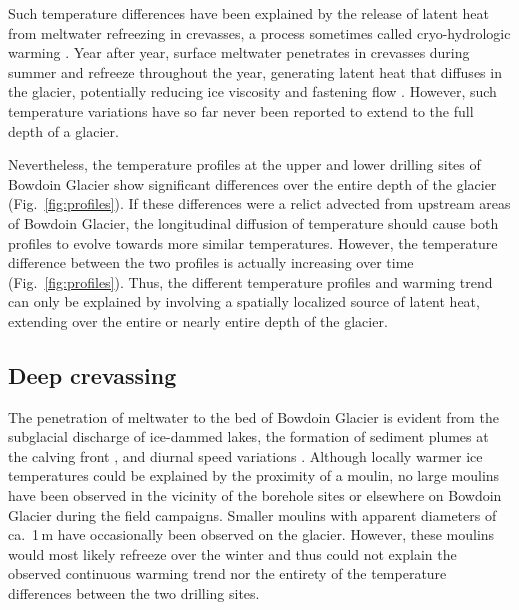\documentclass[utf8]{article}
\begin{document}
    Such temperature differences have been explained by the release of latent
    heat from meltwater refreezing in crevasses, a process sometimes called
    cryo-hydrologic warming \citep{Phillips.etal.2010}. Year after year,
    surface meltwater penetrates in crevasses during summer and refreeze
    throughout the year, generating latent heat that diffuses in the
    glacier, potentially reducing ice viscosity and fastening flow
    \citep{Phillips.etal.2013}. However, such temperature variations have so
    far never been reported to extend to the full depth of a glacier.

    Nevertheless, the temperature profiles at the upper and lower drilling
    sites of Bowdoin Glacier show significant differences over the entire depth
    of the glacier (Fig.~\ref{fig:profiles}). If these differences were a
    relict advected from upstream areas of Bowdoin Glacier, the longitudinal
    diffusion of temperature should cause both profiles to evolve towards more
    similar temperatures. However, the temperature difference between the two
    profiles is actually increasing over time (Fig.~\ref{fig:profiles}).
    Thus, the different temperature profiles and warming trend can only be
    explained by involving a spatially localized source of latent heat,
    extending over the entire or nearly entire depth of the glacier.


\subsection{Deep crevassing}

    The penetration of meltwater to the bed of Bowdoin Glacier is evident from
    the subglacial discharge of ice-dammed lakes, the formation of sediment
    plumes at the calving front \citep{Jouvet.etal.2018, Kanna.etal.2018}, and
    diurnal speed variations \citep{Sugiyama.etal.2014, Podolskiy.etal.2016}.
    Although locally warmer ice temperatures could be explained by the
    proximity of a moulin, no large moulins have been observed in the vicinity
    of the borehole sites or elsewhere on Bowdoin Glacier during the field
    campaigns. Smaller moulins with apparent diameters of ca.~1\,m have
    occasionally been observed on the glacier. However, these moulins would
    most likely refreeze over the winter and thus could not explain the
    observed continuous warming trend nor the entirety of the temperature
    differences between the two drilling sites.
\end{document}

